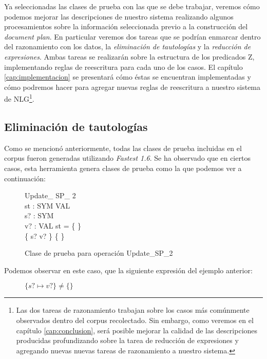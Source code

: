 
Ya seleccionadas las clases de prueba con las que se debe trabajar, veremos cómo podemos mejorar las descripciones de nuestro sistema realizando algunos procesamientos sobre la información seleccionada previo a la construcción del \textit{document plan}. En particular veremos dos tareas que se podrían enmarcar dentro del razonamiento con los datos, la \emph{eliminación de tautologías} y la \emph{reducción de expresiones}. Ambas tareas se realizarán sobre la estructura de los predicados Z, implementando reglas de reescritura para cada uno de los casos. El capítulo \ref{cap:implementacion} se presentará cómo éstas se encuentran implementadas y cómo podremos hacer para agregar nuevas reglas de reescritura a nuestro sistema de NLG\footnote{Las dos tareas de razonamiento trabajan sobre los casos más comúnmente observados dentro del corpus recolectado. Sin embargo, como veremos en el capítulo \ref{cap:conclusion}, será posible mejorar la calidad de las descripciones producidas profundizando sobre la tarea de reducción de expresiones y agregando nuevas nuevas tareas de razonamiento a nuestro sistema.}.

\subsection*{Eliminación de tautologías}
Como se mencionó anteriormente, todas las clases de prueba incluidas en el corpus fueron generadas utilizando \emph{Fastest 1.6}. Se ha observado que en ciertos casos, esta herramienta genera clases de prueba como la que podemos ver a continuación:

\begin{figure}[H]
  \centering
\begin{schema}{Update\_ SP\_ 2}\\
 st : SYM \pfun VAL \\
 s? : SYM \\
 v? : VAL 
\where
 st = \{ \} \\
 \{ s? \mapsto v? \} \neq \{ \}
\end{schema}
  \caption{Clase de prueba para operación Update\_SP\_2}
  \label{fig:ej_update_sp_2}
\end{figure}

Podemos observar en este caso, que la siguiente expresión del ejemplo anterior:

\begin{figure}[H]
  \centering
  $\{ s? \mapsto v? \} \neq \{ \}$ 
\end{figure}


